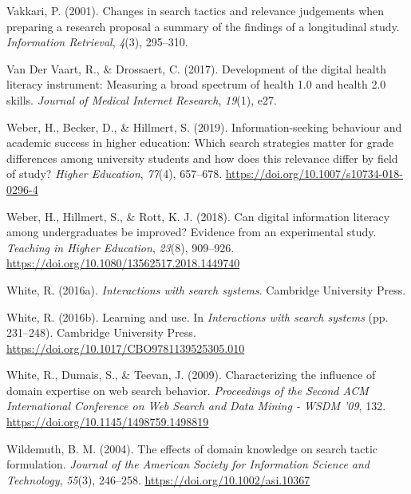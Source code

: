 \documentclass[letterpaper, nobind]{templates/ociamthesis}
\newlength{\cslhangindent}
\newenvironment{CSLReferences}[2] %
 {%
  \setlength{\parindent}{0pt}
  \ifodd #1
  \let\oldpar\par
  \def\par{\hangindent=\cslhangindent\oldpar}
  \fi
  \setlength{\parskip}{1mm}
  \setlength{\baselineskip}{6mm}
 }%
 {}
\begin{document}
\begin{CSLReferences}{1}{0}
\leavevmode{}%
Vakkari, P. (2001). Changes in search tactics and relevance judgements when preparing a research proposal a summary of the findings of a longitudinal study. \emph{Information Retrieval}, \emph{4}(3), 295--310.

\leavevmode{}%
Van Der Vaart, R., \& Drossaert, C. (2017). Development of the digital health literacy instrument: Measuring a broad spectrum of health 1.0 and health 2.0 skills. \emph{Journal of Medical Internet Research}, \emph{19}(1), e27.

\leavevmode{}%
Weber, H., Becker, D., \& Hillmert, S. (2019). Information-seeking behaviour and academic success in higher education: Which search strategies matter for grade differences among university students and how does this relevance differ by field of study? \emph{Higher Education}, \emph{77}(4), 657--678. \url{https://doi.org/10.1007/s10734-018-0296-4}

\leavevmode{}%
Weber, H., Hillmert, S., \& Rott, K. J. (2018). Can digital information literacy among undergraduates be improved? Evidence from an experimental study. \emph{Teaching in Higher Education}, \emph{23}(8), 909--926. \url{https://doi.org/10.1080/13562517.2018.1449740}

\leavevmode{}%
White, R. (2016a). \emph{Interactions with search systems}. Cambridge University Press.

\leavevmode{}%
White, R. (2016b). Learning and use. In \emph{Interactions with search systems} (pp. 231--248). {Cambridge University Press}. \url{https://doi.org/10.1017/CBO9781139525305.010}

\leavevmode{}%
White, R., Dumais, S., \& Teevan, J. (2009). Characterizing the influence of domain expertise on web search behavior. \emph{Proceedings of the {Second ACM International Conference} on {Web Search} and {Data Mining} - {WSDM} '09}, 132. \url{https://doi.org/10.1145/1498759.1498819}

\leavevmode{}%
Wildemuth, B. M. (2004). The effects of domain knowledge on search tactic formulation. \emph{Journal of the American Society for Information Science and Technology}, \emph{55}(3), 246--258. \url{https://doi.org/10.1002/asi.10367}


\end{CSLReferences}
\end{document}
